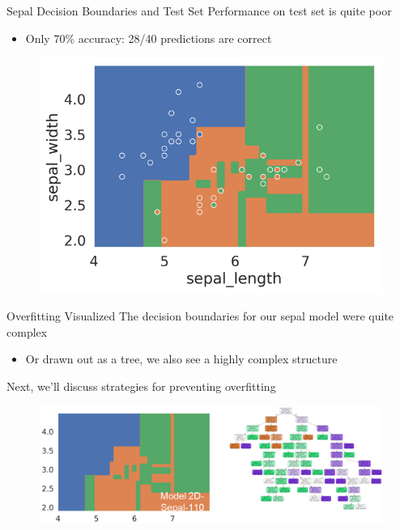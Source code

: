 \documentclass[aspectratio=169]{../latex_main/tntbeamer}  %
\begin{document}
	
	
	\begin{frame}{Sepal Decision Boundaries and Test Set}
	    Performance on test set is quite poor
	    \begin{itemize}
	        \item Only 70\% accuracy: 28/40 predictions are correct
	    \end{itemize}
	    \begin{figure}
	        \centering
	        \includegraphics[scale=.65]{Bild38}
	    \end{figure}
	\end{frame}
	
	
	\begin{frame}{Overfitting Visualized}
	    The decision boundaries for our sepal model were quite complex
	    \begin{itemize}
	        \item Or drawn out as a tree, we also see a highly complex structure
	    \end{itemize}
	    Next, we’ll discuss strategies for preventing overfitting
	    \begin{figure}
	        \centering
	        \includegraphics[scale=.5]{Bild39}
	    \end{figure}
	\end{frame}
\end{document}
